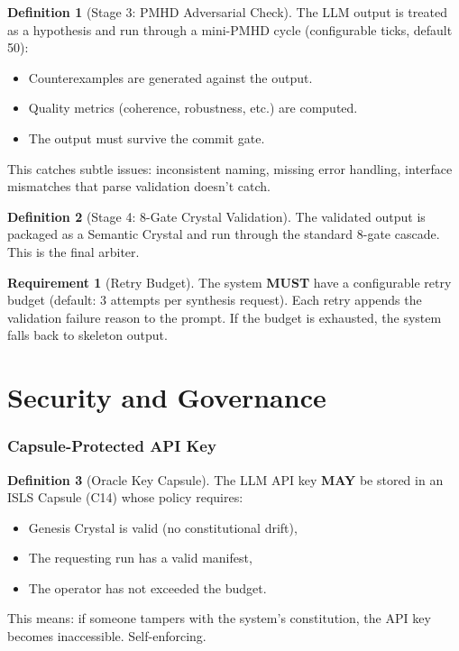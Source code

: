 \documentclass[11pt,a4paper,twoside]{article}
\theoremstyle{definition}
\newtheorem{definition}{Definition}[section]
\newtheorem{requirement}{Requirement}[section]
\theoremstyle{plain}
\theoremstyle{remark}
\newcommand{\ISLS}{\textsf{ISLS}}
\begin{document}
\begin{definition}[Stage 3: PMHD Adversarial Check]\label{def:pmhdcheck}
The LLM output is treated as a hypothesis and run through a
mini-PMHD cycle (configurable ticks, default 50):
\begin{itemize}[nosep]
  \item Counterexamples are generated against the output.
  \item Quality metrics (coherence, robustness, etc.) are computed.
  \item The output must survive the commit gate.
\end{itemize}
This catches subtle issues: inconsistent naming, missing error
handling, interface mismatches that parse validation doesn't catch.
\end{definition}

\begin{definition}[Stage 4: 8-Gate Crystal Validation]\label{def:8gate}
The validated output is packaged as a Semantic Crystal and run
through the standard 8-gate cascade. This is the final arbiter.
\end{definition}

\begin{requirement}[Retry Budget]\label{req:retry}
The system \textbf{MUST} have a configurable retry budget
(default: 3 attempts per synthesis request). Each retry appends
the validation failure reason to the prompt. If the budget is
exhausted, the system falls back to skeleton output.
\end{requirement}


\part{Security and Governance}\label{part:security}

\section{Capsule-Protected API Key}\label{sec:capsulekey}

\begin{definition}[Oracle Key Capsule]\label{def:keycapsule}
The LLM API key \textbf{MAY} be stored in an \ISLS{} Capsule (C14)
whose policy requires:
\begin{itemize}[nosep]
  \item Genesis Crystal is valid (no constitutional drift),
  \item The requesting run has a valid manifest,
  \item The operator has not exceeded the budget.
\end{itemize}
This means: if someone tampers with the system's constitution, the
API key becomes inaccessible. Self-enforcing.
\end{definition}
\end{document}
